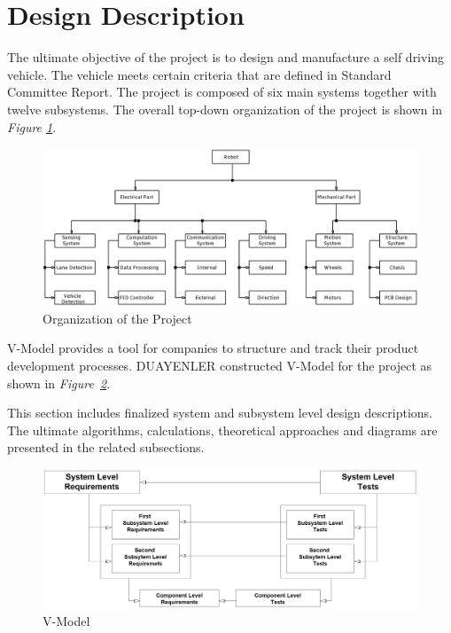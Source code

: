 \documentclass[a4paper,12pt]{article}
\begin{document}
\newpage




\section{Design Description} 

	
	The ultimate objective of the project is to design and manufacture a self driving vehicle. The vehicle meets certain criteria that are defined in Standard Committee Report. The project is composed of six main systems together with twelve subsystems. The overall top-down organization of the project is shown in \textit{Figure \ref{fig:organization}}.


	\begin{figure}[h]
		\includegraphics[width=\textwidth,center]{images/system}
		\caption{Organization of the Project}\label{fig:organization}
	\end{figure}

	V-Model provides a tool for companies to structure and track their product development processes. DUAYENLER constructed V-Model for the project as shown in \textit{Figure~\ref{fig:vmodel}}. 

	This section includes finalized system and subsystem level design descriptions. The ultimate algorithms, calculations, theoretical approaches and diagrams are presented in the related subsections.

	
	\begin{figure}[h]
		\includegraphics[width=\textwidth,center]{images/vModels/vmodel}
		\caption{V-Model}\label{fig:vmodel}
	\end{figure}
\end{document}
